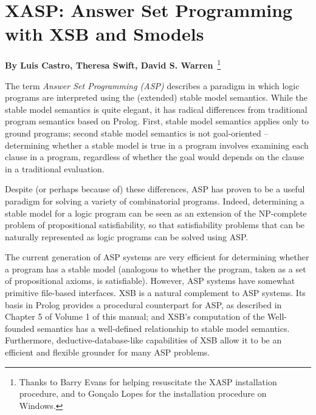 \chapter[{\tt XASP}]{XASP: Answer Set Programming with XSB and Smodels}
\label{xasp}

\begin{center}
{\Large {\bf By Luis Castro, Theresa Swift, David
    S. Warren}~\footnote{ Thanks to Barry Evans for helping
    resuscitate the XASP installation procedure, and to Gon\c{c}alo Lopes
    for the installation procedure on Windows.}}
\end{center}

The term {\em Answer Set Programming (ASP)} describes a paradigm in
which logic programs are interpreted using the (extended) stable model
semantics.  While the stable model semantics is quite elegant, it has
radical differences from traditional program semantics based on
Prolog.  First, stable model semantics applies only to ground
programs; second stable model semantics is not goal-oriented --
determining whether a stable model is true in a program involves
examining each clause in a program, regardless of whether the goal would
depends on the clause in a traditional evaluation.

Despite (or perhaps because of) these differences, ASP has proven to
be a useful paradigm for solving a variety of combinatorial programs.
Indeed, determining a stable model for a logic program can be seen as
an extension of the NP-complete problem of propositional
satisfiability, so that satisfiability problems that can be naturally
represented as logic programs can be solved using ASP.  

The current generation of ASP systems are very efficient for
determining whether a program has a stable model (analogous to whether
the program, taken as a set of propositional axioms, is satisfiable).
However, ASP systems have somewhat primitive file-based interfaces.
XSB is a natural complement to ASP systems.  Its basis in Prolog
provides a procedural counterpart for ASP, as described in Chapter 5 of
Volume 1 of this manual; and XSB's computation of the Well-founded
semantics has a well-defined relationship to stable model semantics.
Furthermore, deductive-database-like capabilities of XSB allow it to
be an efficient and flexible grounder for many ASP problems.

